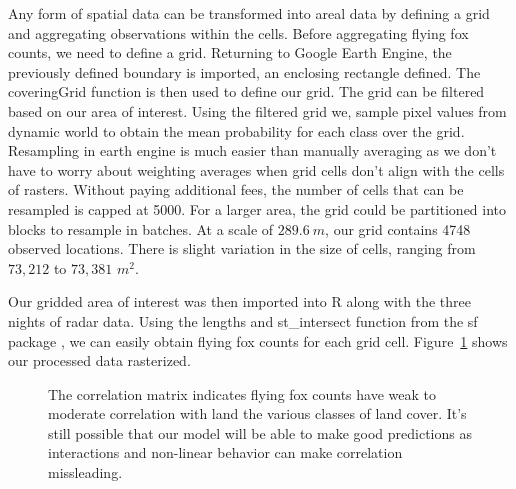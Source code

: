 \documentclass[
  12pt,
  letterpaper,
  DIV=11,
  numbers=noendperiod]{scrartcl}
\begin{document}
Any form of spatial data can be transformed into areal data by defining
a grid and aggregating observations within the cells. Before aggregating
flying fox counts, we need to define a grid. Returning to Google Earth
Engine, the previously defined boundary is imported, an enclosing
rectangle defined. The coveringGrid function is then used to define our
grid. The grid can be filtered based on our area of interest. Using the
filtered grid we, sample pixel values from dynamic world to obtain the
mean probability for each class over the grid. Resampling in earth
engine is much easier than manually averaging as we don't have to worry
about weighting averages when grid cells don't align with the cells of
rasters. Without paying additional fees, the number of cells that can be
resampled is capped at 5000. For a larger area, the grid could be
partitioned into blocks to resample in batches. At a scale of
\(289.6\ m\), our grid contains 4748 observed locations. There is slight
variation in the size of cells, ranging from \(73,212\) to \(73,381\)
\(m^2\).

Our gridded area of interest was then imported into R along with the
three nights of radar data. Using the lengths and st\_intersect function
from the sf package \citep{sf}, we can easily obtain flying fox counts
for each grid cell. Figure~\ref{fig-rast-proces} shows our processed
data rasterized.

\begin{figure}[H]


\caption{\label{fig-rast-proces}The correlation matrix indicates flying
fox counts have weak to moderate correlation with land the various
classes of land cover. It's still possible that our model will be able
to make good predictions as interactions and non-linear behavior can
make correlation missleading.}

\end{figure}%
\end{document}
